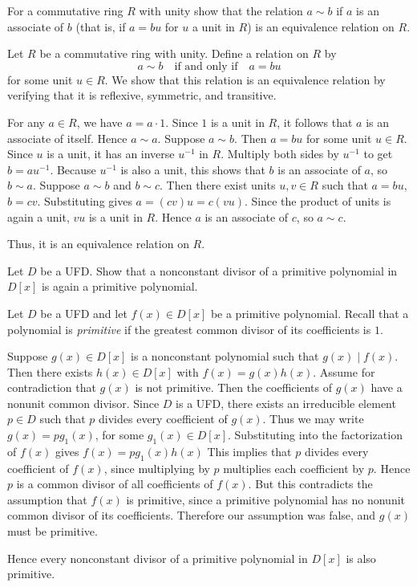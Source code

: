 \begin{problem}[34.27]
  For a commutative ring $R$ with unity show that the relation $a \sim b$ if $a$ is an associate of $b$ (that is, if $a = bu$ for $u$ a unit in $R$) is an equivalence relation on $R$.
\end{problem}

\begin{solution}
  Let $R$ be a commutative ring with unity. Define a relation on $R$ by
  \[
    a \sim b \quad \text{if and only if} \quad a = bu
  \]
  for some unit $u \in R$. We show that this relation is an equivalence relation by verifying that it is reflexive, symmetric, and transitive.

  For any $a \in R$, we have $a = a \cdot 1$. Since $1$ is a unit in $R$, it follows that $a$ is an associate of itself. Hence $a \sim a$. Suppose $a \sim b$. Then $a = bu$ for some unit $u \in R$. Since $u$ is a unit, it has an inverse $u^{-1}$ in $R$. Multiply both sides by $u^{-1}$ to get $b = a u^{-1}$. Because $u^{-1}$ is also a unit, this shows that $b$ is an associate of $a$, so $b \sim a$. Suppose $a \sim b$ and $b \sim c$. Then there exist units $u,v \in R$ such that $a = bu$, $b = cv$. Substituting gives $a = (cv)u = c(vu)$. Since the product of units is again a unit, $vu$ is a unit in $R$. Hence $a$ is an associate of $c$, so $a \sim c$.

  Thus, it is an equivalence relation on $R$.
\end{solution}

\begin{problem}[34.29]
  Let $D$ be a UFD. Show that a nonconstant divisor of a primitive polynomial in $D[x]$ is again a primitive polynomial.
\end{problem}

\begin{solution}
  Let $D$ be a UFD and let $f(x) \in D[x]$ be a primitive polynomial. Recall that a polynomial is \emph{primitive} if the greatest common divisor of its coefficients is $1$.

  Suppose $g(x) \in D[x]$ is a nonconstant polynomial such that $g(x) \mid f(x)$. Then there exists $h(x) \in D[x]$ with $f(x) = g(x)h(x)$. Assume for contradiction that $g(x)$ is not primitive. Then the coefficients of $g(x)$ have a nonunit common divisor. Since $D$ is a UFD, there exists an irreducible element $p \in D$ such that $p$ divides every coefficient of $g(x)$. Thus we may write $g(x) = pg_1(x)$, for some $g_1(x) \in D[x]$. Substituting into the factorization of $f(x)$ gives $f(x) = pg_1(x)h(x)$ This implies that $p$ divides every coefficient of $f(x)$, since multiplying by $p$ multiplies each coefficient by $p$. Hence $p$ is a common divisor of all coefficients of $f(x)$. But this contradicts the assumption that $f(x)$ is primitive, since a primitive polynomial has no nonunit common divisor of its coefficients. Therefore our assumption was false, and $g(x)$ must be primitive.

  Hence every nonconstant divisor of a primitive polynomial in $D[x]$ is also primitive.
\end{solution}

